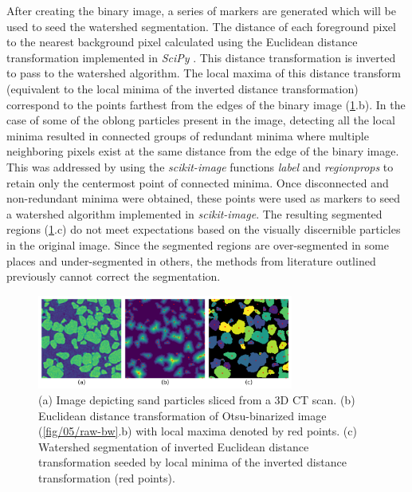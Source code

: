 After creating the binary image, a series of markers are generated which
will be used to seed the watershed segmentation. The distance of each
foreground pixel to the nearest background pixel calculated using the
Euclidean distance transformation implemented in \textit{SciPy} \cite{scipy}.
This distance
transformation is inverted to pass to the watershed algorithm. The local
maxima of this distance transform (equivalent to the local minima of the
inverted distance transformation) correspond to the points farthest from
the edges of the binary image (\ref{fig/05/typical}.b).
In the case of some of the
oblong particles present in the image, detecting all the local minima
resulted in connected groups of redundant minima where multiple
neighboring pixels exist at the same distance from the edge of the binary
image. This was addressed by using the \textit{scikit-image} functions
\textit{label} and \textit{regionprops} to retain only the centermost
point of connected minima. Once disconnected and non-redundant minima
were obtained, these points were used as markers to seed a watershed
algorithm implemented in \textit{scikit-image}.
The resulting segmented regions (\ref{fig/05/typical}.c) do not meet
expectations based on the visually discernible particles in the original
image. Since the segmented regions are over-segmented in some places and
under-segmented in others, the methods from literature outlined previously
cannot correct the segmentation.

\begin{figure}[ht]
    \centering
    \includegraphics[width=0.75\textwidth]{figures/05/02-typical-routine.png}
    \caption{
        \small{}
        (a) Image depicting sand particles sliced from a 3D CT scan.
        (b) Euclidean distance transformation of Otsu-binarized image
        (\ref{fig/05/raw-bw}.b) with local maxima denoted by red points.
        (c) Watershed segmentation of inverted Euclidean distance
        transformation seeded by local minima of the inverted distance
        transformation (red points).
    }
    \label{fig/05/typical}
\end{figure}

